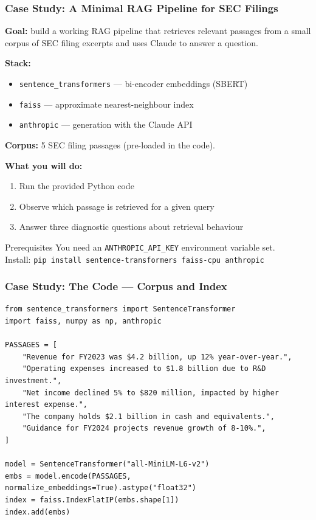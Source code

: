 \documentclass[9pt,t]{beamer}
\begin{document}
\begin{frame}
\frametitle{Case Study: A Minimal RAG Pipeline for SEC Filings}

\textbf{Goal:} build a working RAG pipeline that retrieves relevant passages from
a small corpus of SEC filing excerpts and uses Claude to answer a question.

\medskip
\textbf{Stack:}
\begin{itemize}
  \item \texttt{sentence\_transformers} — bi-encoder embeddings (SBERT)
  \item \texttt{faiss} — approximate nearest-neighbour index
  \item \texttt{anthropic} — generation with the Claude API
\end{itemize}

\medskip
\textbf{Corpus:} 5 SEC filing passages (pre-loaded in the code).

\medskip
\textbf{What you will do:}
\begin{enumerate}
  \item Run the provided Python code
  \item Observe which passage is retrieved for a given query
  \item Answer three diagnostic questions about retrieval behaviour
\end{enumerate}

\medskip
\begin{alertblock}{Prerequisites}
You need an \texttt{ANTHROPIC\_API\_KEY} environment variable set.\\
Install: \texttt{pip install sentence-transformers faiss-cpu anthropic}
\end{alertblock}
\end{frame}

\begin{frame}[fragile]
\frametitle{Case Study: The Code --- Corpus and Index}

{\footnotesize
\begin{lstlisting}
from sentence_transformers import SentenceTransformer
import faiss, numpy as np, anthropic

PASSAGES = [
    "Revenue for FY2023 was $4.2 billion, up 12% year-over-year.",
    "Operating expenses increased to $1.8 billion due to R&D investment.",
    "Net income declined 5% to $820 million, impacted by higher interest expense.",
    "The company holds $2.1 billion in cash and equivalents.",
    "Guidance for FY2024 projects revenue growth of 8-10%.",
]

model = SentenceTransformer("all-MiniLM-L6-v2")
embs = model.encode(PASSAGES, normalize_embeddings=True).astype("float32")
index = faiss.IndexFlatIP(embs.shape[1])
index.add(embs)
\end{lstlisting}
}
\end{frame}
\end{document}
